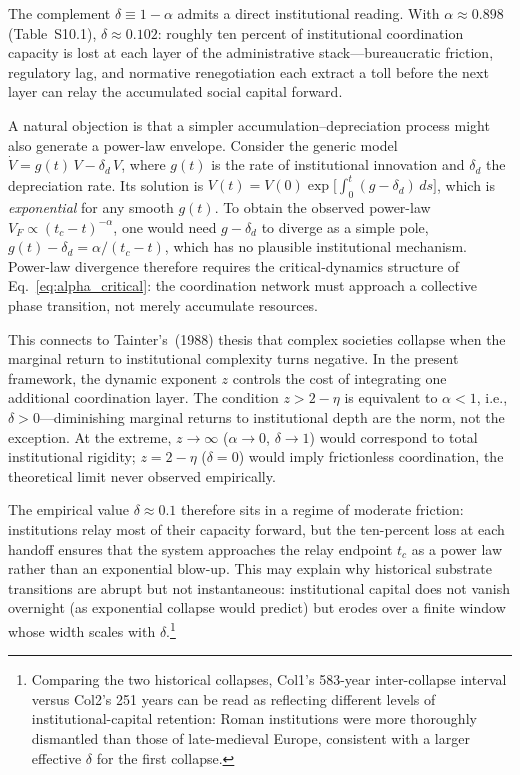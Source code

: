 \documentclass[11pt]{article}
\begin{document}
The complement $\delta \equiv 1 - \alpha$ admits a direct institutional reading.
With $\alpha \approx 0.898$ (Table~S10.1), $\delta \approx 0.102$: roughly ten
percent of institutional coordination capacity is lost at each layer of the
administrative stack---bureaucratic friction, regulatory lag, and normative
renegotiation each extract a toll before the next layer can relay the
accumulated social capital forward.

A natural objection is that a simpler accumulation--depreciation process might
also generate a power-law envelope.  Consider the generic model
$\dot{V} = g(t)\,V - \delta_d\,V$, where $g(t)$ is the rate of institutional
innovation and $\delta_d$ the depreciation rate.  Its solution is
$V(t) = V(0)\exp\bigl[\int_0^t (g-\delta_d)\,ds\bigr]$, which is
\emph{exponential} for any smooth $g(t)$.  To obtain the observed power-law
$V_F \propto (t_c - t)^{-\alpha}$, one would need $g - \delta_d$ to diverge
as a simple pole, $g(t)-\delta_d = \alpha/(t_c - t)$, which has no plausible institutional
mechanism.  Power-law divergence therefore requires the critical-dynamics
structure of Eq.~\ref{eq:alpha_critical}: the coordination network must
approach a collective phase transition, not merely accumulate resources.

This connects to Tainter's~(1988) thesis that complex societies collapse
when the marginal return to institutional complexity turns negative.  In the
present framework, the dynamic exponent $z$ controls the cost of
integrating one additional coordination layer.  The condition $z > 2 - \eta$
is equivalent to $\alpha < 1$, i.e., $\delta > 0$---diminishing marginal
returns to institutional depth are the norm, not the exception.  At
the extreme, $z \to \infty$ ($\alpha \to 0$, $\delta \to 1$) would correspond
to total institutional rigidity; $z = 2 - \eta$ ($\delta = 0$) would imply
frictionless coordination, the theoretical limit never observed empirically.

The empirical value $\delta \approx 0.1$ therefore sits in a regime of
moderate friction: institutions relay most of their capacity forward,
but the ten-percent loss at each handoff ensures that the system
approaches the relay endpoint $t_c$ as a power law rather than
an exponential blow-up.  This may explain why historical substrate
transitions are abrupt but not instantaneous: institutional capital
does not vanish overnight (as exponential collapse would predict)
but erodes over a finite window whose width scales with
$\delta$.\footnote{Comparing the two historical collapses,
Col1's 583-year inter-collapse interval versus Col2's 251 years
can be read as reflecting different levels of institutional-capital
retention: Roman institutions were more thoroughly dismantled than
those of late-medieval Europe, consistent with a larger effective
$\delta$ for the first collapse.}
\end{document}
